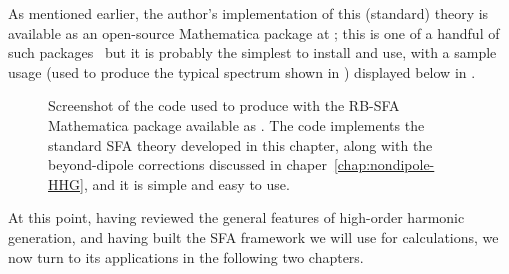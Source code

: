 As mentioned earlier, the author's implementation of this (standard) theory is available as an open-source Mathematica package at ; this is one of a handful of such packages~\cite{rhyno_thesis, rhyno_code, hhgmax_thesis, hhgmax_code, slimp_paper, ClassSTRONG_paper} but it is probably the simplest to install and use, with a sample usage (used to produce the typical spectrum shown in ) displayed below in .




\begin{figure}[htbp]
  \centering
  \captionsetup{width=0.96\textwidth}
  \caption[
  Sample screenshot of the RBSFA code used to calculate HHG spectra
  ]{
  Screenshot of the code used to produce  with the RB-SFA Mathematica package available as . The code implements the standard SFA theory developed in this chapter, along with the beyond-dipole corrections discussed in chaper~\ref{chap:nondipole-HHG}, and it is simple and easy to use.
  }
\label{f7-RBSFA-screenshot}
\end{figure}


At this point, having reviewed the general features of high-order harmonic generation, and having built the SFA framework we will use for calculations, we now turn to its applications in the following two chapters.































